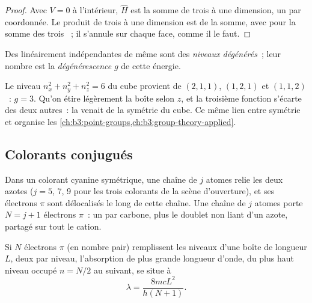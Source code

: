 \begin{proof}
Avec $V = 0$ à l'intérieur, $\hat H$ est la somme de trois  à une
dimension, un par coordonnée. Le produit de trois  à une
dimension est  de la somme, avec pour  la
somme des trois ~; il s'annule sur chaque face, comme il
le faut.
\end{proof}

\begin{definition}\label{def:b3:quantum-model-systems:degenerate}
Des  linéairement indépendantes de même 
sont des \emph{niveaux dégénérés}~; leur nombre est la
\emph{dégénérescence} $g$ de cette énergie.
\end{definition}

\begin{example}\label{ex:b3:quantum-model-systems:cube}
Le niveau $n_x^2 + n_y^2 + n_z^2 = 6$ du cube provient de $(2,1,1)$,
$(1,2,1)$ et $(1,1,2)$~: $g = 3$. Qu'on étire légèrement la boîte selon $z$,
et la troisième fonction s'écarte des deux autres~: la 
venait de la symétrie du cube. Ce même lien entre symétrie et
 organise les \cref{ch:b3:point-groups,ch:b3:group-theory-applied}.
\end{example}

\subsection*{Colorants conjugués}

Dans un colorant cyanine symétrique, une chaîne de $j$ atomes relie les
deux azotes (\(j = 5\), 7, 9 pour les trois colorants de la scène
d'ouverture), et ses électrons $\pi$ sont délocalisés le long de cette
chaîne. Une chaîne de $j$ atomes porte $N = j + 1$ électrons $\pi$~: un
par carbone, plus le doublet non liant d'un azote, partagé sur tout le
cation.

\begin{proposition}\label{prop:b3:quantum-model-systems:free-electron}
Si $N$ électrons $\pi$ (en nombre pair) remplissent les niveaux d'une
boîte de longueur $L$, deux par niveau, l'absorption de plus grande
longueur d'onde, du plus haut niveau occupé $n = N/2$ au suivant, se
situe à
\[
\lambda = \frac{8mcL^2}{h(N+1)}.
\]
\end{proposition}

